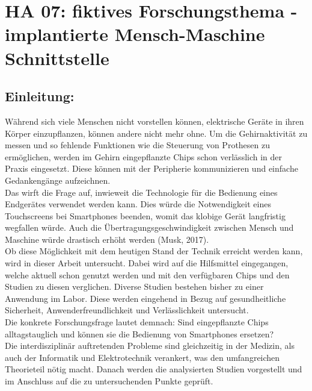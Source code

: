 \section{HA 07: fiktives Forschungsthema - implantierte Mensch-Maschine Schnittstelle}
\subsection{Einleitung:}
  Während sich viele Menschen nicht vorstellen können, elektrische Geräte in ihren Körper einzupflanzen, können andere nicht mehr ohne. Um die Gehirnaktivität zu messen und so fehlende Funktionen wie die Steuerung von Prothesen zu ermöglichen, werden im Gehirn eingepflanzte Chips schon verlässlich in der Praxis eingesetzt. Diese können mit der Peripherie kommunizieren und einfache Gedankengänge aufzeichnen.\\
  Das wirft die Frage auf, inwieweit die Technologie für die Bedienung eines Endgerätes verwendet werden kann. Dies würde die Notwendigkeit eines Touchscreens bei Smartphones beenden, womit das klobige Gerät langfristig wegfallen würde. Auch die Übertragungsgeschwindigkeit zwischen Mensch und Maschine würde drastisch erhöht werden (Musk, 2017). \\
  Ob diese Möglichkeit mit dem heutigen Stand der Technik erreicht werden kann, wird in dieser Arbeit untersucht. Dabei wird auf die Hilfsmittel eingegangen, welche aktuell schon genutzt werden und mit den verfügbaren Chips und den Studien zu diesen verglichen. Diverse Studien bestehen bisher zu einer Anwendung im Labor. Diese werden eingehend in Bezug auf gesundheitliche Sicherheit, Anwenderfreundlichkeit und Verlässlichkeit untersucht.\\
  Die konkrete Forschungsfrage lautet demnach:
  Sind eingepflanzte Chips alltagstauglich und können sie die Bedienung von Smartphones ersetzen?\\
  Die interdisziplinär auftretenden Probleme sind gleichzeitig in der Medizin, als auch der Informatik und Elektrotechnik verankert, was den umfangreichen Theorieteil nötig macht. Danach werden die analysierten Studien vorgestellt und im Anschluss auf die zu untersuchenden Punkte geprüft.
